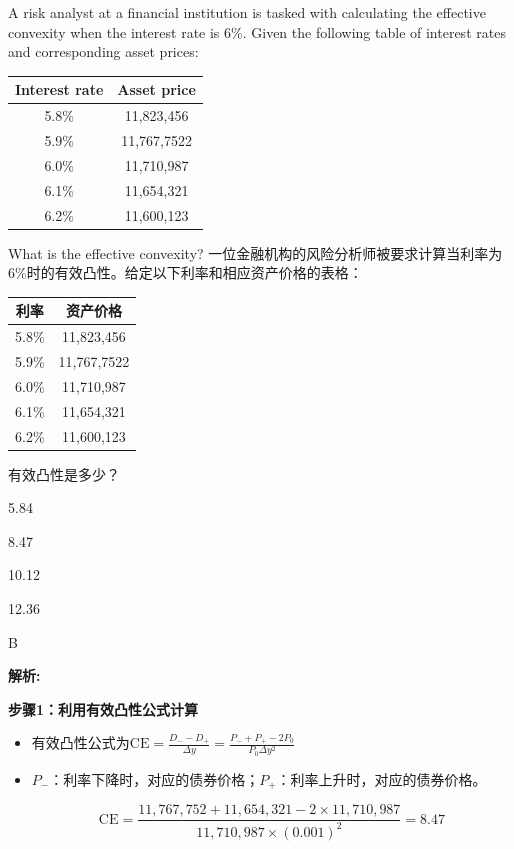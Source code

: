\documentclass{article}
\newcounter{question} %
\newenvironment{explanation}
{\textbf{解析:}\par}
{\par}
\begin{document}
\begin{question}
    A risk analyst at a financial institution is tasked with calculating the effective convexity when the interest rate is 6\%. Given the following table of interest rates and corresponding asset prices:
    \begin{center}
    \begin{tabular}{|c|c|}
    \hline
    Interest rate & Asset price \\
    \hline
    5.8\% & 11,823,456 \\
    \hline
    5.9\% & 11,767,7522 \\
    \hline
    6.0\% & 11,710,987 \\
    \hline
    6.1\% & 11,654,321 \\
    \hline
    6.2\% & 11,600,123 \\
    \hline
    \end{tabular}
    \end{center}
    What is the effective convexity?
    一位金融机构的风险分析师被要求计算当利率为6\%时的有效凸性。给定以下利率和相应资产价格的表格：
    \begin{center}
    \begin{tabular}{|c|c|}
    \hline
    利率 & 资产价格 \\
    \hline
    5.8\% & 11,823,456 \\
    \hline
    5.9\% & 11,767,7522 \\
    \hline
    6.0\% & 11,710,987 \\
    \hline
    6.1\% & 11,654,321 \\
    \hline
    6.2\% & 11,600,123 \\
    \hline
    \end{tabular}
    \end{center}
    有效凸性是多少？
    \end{question}
    
    \begin{choices}
        \item 5.84
        \item 8.47
        \item 10.12
        \item 12.36
    \end{choices}
    
    \begin{correctanswer}
    B
    \end{correctanswer}
    
    \begin{explanation}
    \textbf{步骤1：利用有效凸性公式计算}
    \begin{itemize}
    \item 有效凸性公式为\(\text{CE} = \frac{D_- - D_+}{\Delta y} = \frac{P_- + P_+ - 2P_0}{P_0 \Delta y^2}\)
    \item \( P_- \)：利率下降时，对应的债券价格；\( P_+ \)：利率上升时，对应的债券价格。

    \[
    \text{CE}=\frac{11,767,752 + 11,654,321 - 2\times 11,710,987}{ 11,710,987\times(0.001)^2}=8.47
    \]
    \end{itemize}
    \end{explanation}
    
\end{document}
